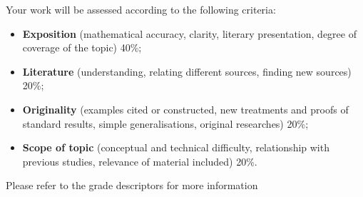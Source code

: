 \documentclass{scrartcl}
\begin{document}
Your work will be assessed according to the following criteria:
\begin{itemize}
\item    \textbf{Exposition} (mathematical accuracy, clarity, literary presentation, degree of coverage of the topic) 40\%;
\item    \textbf{Literature} (understanding, relating different sources, finding new sources) 20\%;
\item    \textbf{Originality} (examples cited or constructed, new treatments and proofs of standard results, simple generalisations, original researches) 20\%;
\item    \textbf{Scope of topic} (conceptual and technical difficulty, relationship with previous studies, relevance of material included) 20\%.
\end{itemize}
Please refer to the grade descriptors for more information
\vspace{.8cm}
\end{document}
